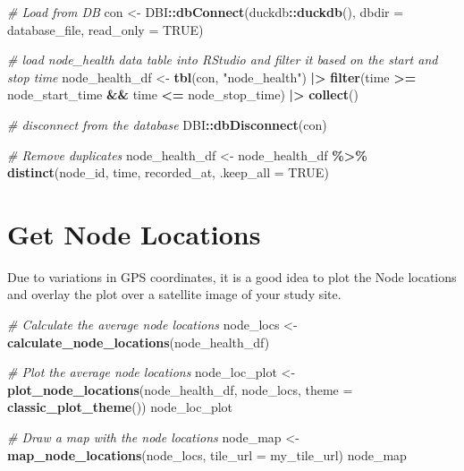 \documentclass[
]{book}
\newenvironment{Shaded}{\begin{snugshade}}{\end{snugshade}}
\newcommand{\AttributeTok}[1]{\textcolor[rgb]{0.13,0.29,0.53}{#1}}
\newcommand{\CommentTok}[1]{\textcolor[rgb]{0.56,0.35,0.01}{\textit{#1}}}
\newcommand{\ConstantTok}[1]{\textcolor[rgb]{0.56,0.35,0.01}{#1}}
\newcommand{\FunctionTok}[1]{\textcolor[rgb]{0.13,0.29,0.53}{\textbf{#1}}}
\newcommand{\NormalTok}[1]{#1}
\newcommand{\OtherTok}[1]{\textcolor[rgb]{0.56,0.35,0.01}{#1}}
\newcommand{\SpecialCharTok}[1]{\textcolor[rgb]{0.81,0.36,0.00}{\textbf{#1}}}
\newcommand{\StringTok}[1]{\textcolor[rgb]{0.31,0.60,0.02}{#1}}
\begin{document}
\begin{Shaded}
\begin{Highlighting}[]
\CommentTok{\# Load from DB}
\NormalTok{con }\OtherTok{\textless{}{-}}\NormalTok{ DBI}\SpecialCharTok{::}\FunctionTok{dbConnect}\NormalTok{(duckdb}\SpecialCharTok{::}\FunctionTok{duckdb}\NormalTok{(), }
                      \AttributeTok{dbdir =}\NormalTok{ database\_file, }
                      \AttributeTok{read\_only =} \ConstantTok{TRUE}\NormalTok{)}

\CommentTok{\# load node\_health data table into RStudio and filter it based on the start and stop time}
\NormalTok{node\_health\_df }\OtherTok{\textless{}{-}} \FunctionTok{tbl}\NormalTok{(con, }\StringTok{"node\_health"}\NormalTok{) }\SpecialCharTok{|\textgreater{}}
  \FunctionTok{filter}\NormalTok{(time }\SpecialCharTok{\textgreater{}=}\NormalTok{ node\_start\_time }\SpecialCharTok{\&\&}\NormalTok{ time }\SpecialCharTok{\textless{}=}\NormalTok{ node\_stop\_time) }\SpecialCharTok{|\textgreater{}}
  \FunctionTok{collect}\NormalTok{()}

\CommentTok{\# disconnect from the database}
\NormalTok{DBI}\SpecialCharTok{::}\FunctionTok{dbDisconnect}\NormalTok{(con)}

\CommentTok{\# Remove duplicates}
\NormalTok{node\_health\_df }\OtherTok{\textless{}{-}}\NormalTok{ node\_health\_df }\SpecialCharTok{\%\textgreater{}\%} 
  \FunctionTok{distinct}\NormalTok{(node\_id, }
\NormalTok{           time, }
\NormalTok{           recorded\_at, }
           \AttributeTok{.keep\_all =} \ConstantTok{TRUE}\NormalTok{)}
\end{Highlighting}
\end{Shaded}

\section{Get Node Locations}\label{get-node-locations-1}

Due to variations in GPS coordinates, it is a good idea to plot the Node locations and overlay the plot over a satellite image of your study site.

\begin{Shaded}
\begin{Highlighting}[]
\CommentTok{\# Calculate the average node locations}
\NormalTok{node\_locs }\OtherTok{\textless{}{-}} \FunctionTok{calculate\_node\_locations}\NormalTok{(node\_health\_df)}

\CommentTok{\# Plot the average node locations}
\NormalTok{node\_loc\_plot }\OtherTok{\textless{}{-}} \FunctionTok{plot\_node\_locations}\NormalTok{(node\_health\_df, }
\NormalTok{                                     node\_locs, }
                                     \AttributeTok{theme =} \FunctionTok{classic\_plot\_theme}\NormalTok{())}
\NormalTok{node\_loc\_plot}

\CommentTok{\# Draw a map with the node locations}
\NormalTok{node\_map }\OtherTok{\textless{}{-}} \FunctionTok{map\_node\_locations}\NormalTok{(node\_locs, }\AttributeTok{tile\_url =}\NormalTok{ my\_tile\_url)}
\NormalTok{node\_map}
\end{Highlighting}
\end{Shaded}
\end{document}
